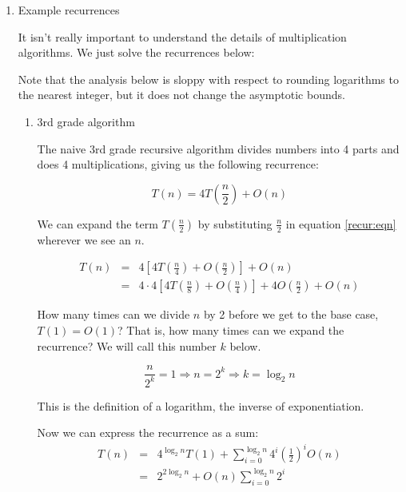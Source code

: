 \documentclass{article}[10pth]
\begin{document}
\begin{enumerate}

\item{Example recurrences}

It isn't really important to understand the details of multiplication
algorithms. We just solve the recurrences below:

Note that the analysis below is sloppy with respect to rounding logarithms
to the nearest integer, but it does not change the asymptotic bounds.

\begin{enumerate}

\item{3rd grade algorithm} %

The naive 3rd grade recursive algorithm divides numbers into 4 parts and
does 4 multiplications, giving us the following recurrence:

\begin{equation}
T(n) = 4T(\frac{n}{2}) + O(n)
\label{recur:eqn}
\end{equation}

We can expand the term $T(\frac{n}{2})$ by substituting $\frac{n}{2}$ in
equation \ref{recur:eqn} wherever we see an $n$.

\begin{eqnarray}
T(n) & = & 4 [ 4 T(\frac{n}{4}) + O(\frac{n}{2})] + O(n)\\
     & = & 4\cdot 4 [ 4 T(\frac{n}{8}) + O(\frac{n}{4}) ] + 4O(\frac{n}{2}) + O(n)
\end{eqnarray}

How many times can we divide $n$ by 2 before we get to the base case,
$T(1) = O(1)$? That is, how many times can we expand the recurrence?
We will call this number $k$ below.

\begin{equation}
\frac{n}{2^k} = 1 \Rightarrow n = 2^k \Rightarrow k = \log_2{n}
\end{equation}

This is the definition of a logarithm, the inverse of exponentiation.

Now we can express the recurrence as a sum:
%
\begin{eqnarray}
T(n) & = & 4^{\log_2{n}}T(1) + \sum_{i=0}^{\log_2{n}} 4^i(\frac{1}{2})^iO(n)\\
     & = & 2^{2\log_2{n}} + O(n)\sum_{i=0}^{\log_2{n}}2^i
\end{eqnarray}


\end{enumerate}
\end{enumerate}
\end{document}

